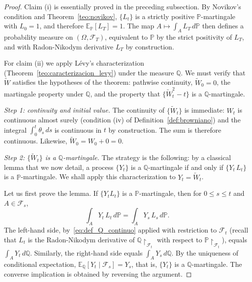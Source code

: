 \documentclass[11pt,a4paper,oneside]{report}
\theoremstyle{plain}
\theoremstyle{definition}
\theoremstyle{remark}
\newcommand{\E}{\mathbb{E}}
\newcommand{\PP}{\mathbb{P}}
\newcommand{\Q}{\mathbb{Q}}
\newcommand{\F}{\mathcal{F}}
\newcommand{\1}{\mathbf{1}}
\begin{document}
\begin{proof}
Claim (i) is essentially proved in the preceding subsection. By
Novikov's condition and Theorem~\ref{teo:novikov}, $\{L_t\}$ is a
strictly positive $\PP$-martingale with $L_0 = 1$, and therefore
$\E_\PP[L_T] = 1$. The map $A \mapsto \int_A L_T\, d\PP$ then defines
a probability measure on $(\Omega, \F_T)$, equivalent to $\PP$ by the
strict positivity of $L_T$, and with Radon-Nikodym derivative $L_T$
by construction.

For claim (ii) we apply Lévy's characterization
(Theorem~\ref{teo:caracterizacion_levy}) under the measure $\Q$. We
must verify that $\widetilde{W}$ satisfies the hypotheses of the
theorem: pathwise continuity, $\widetilde{W}_0 = 0$, the martingale
property under $\Q$, and the property that
$\{\widetilde{W}_t^2 - t\}$ is a $\Q$-martingale.

\emph{Step 1: continuity and initial value.} The continuity of
$\{\widetilde{W}_t\}$ is immediate: $W_t$ is continuous almost surely
(condition (iv) of Definition~\ref{def:browniano}) and the integral
$\int_0^t \theta_s\, ds$ is continuous in $t$ by construction. The
sum is therefore continuous. Likewise,
$\widetilde{W}_0 = W_0 + 0 = 0$.

\emph{Step 2: $\{\widetilde{W}_t\}$ is a $\Q$-martingale.} The
strategy is the following: by a classical lemma that we now detail,
a process $\{Y_t\}$ is a $\Q$-martingale if and only if
$\{Y_t\, L_t\}$ is a $\PP$-martingale. We shall apply this
characterization to $Y_t = \widetilde{W}_t$.

\noindent Let us first prove the lemma. If $\{Y_t L_t\}$ is a
$\PP$-martingale, then for $0 \leq s \leq t$ and $A \in \F_s$,
\begin{equation*}
  \int_A Y_t\, L_t\, d\PP = \int_A Y_s\, L_s\, d\PP.
\end{equation*}
The left-hand side, by~\eqref{eq:def_Q_continuo} applied with
restriction to $\F_t$ (recall that $L_t$ is the Radon-Nikodym
derivative of $\Q\!\restriction_{\F_t}$ with respect to
$\PP\!\restriction_{\F_t}$), equals $\int_A Y_t\, d\Q$. Similarly, the
right-hand side equals $\int_A Y_s\, d\Q$. By the uniqueness of
conditional expectation, $\E_\Q[Y_t \mid \F_s] = Y_s$, that is,
$\{Y_t\}$ is a $\Q$-martingale. The converse implication is obtained
by reversing the argument.


\end{proof}
\end{document}
